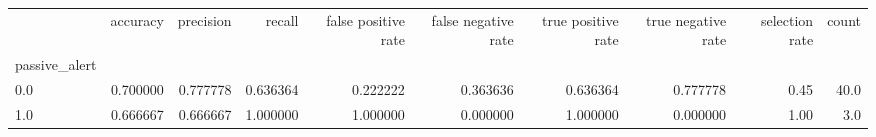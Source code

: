 \begin{tabular}{lrrrrrrrrr}
\toprule
{} &  accuracy &  precision &    recall &  false positive rate &  false negative rate &  true positive rate &  true negative rate &  selection rate &  count \\
passive\_alert &           &            &           &                      &                      &                     &                     &                 &        \\
\midrule
0.0           &  0.700000 &   0.777778 &  0.636364 &             0.222222 &             0.363636 &            0.636364 &            0.777778 &            0.45 &   40.0 \\
1.0           &  0.666667 &   0.666667 &  1.000000 &             1.000000 &             0.000000 &            1.000000 &            0.000000 &            1.00 &    3.0 \\
\bottomrule
\end{tabular}
